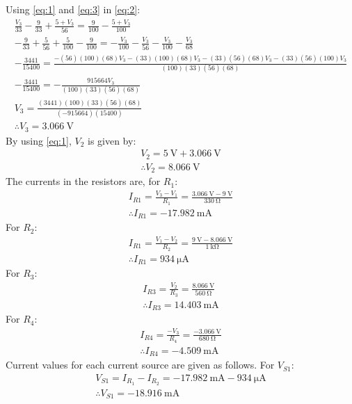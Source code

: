 \documentclass[letterpaper]{article}
\begin{document}
Using \eqref{eq:1} and \eqref{eq:3} in \eqref{eq:2}:
\begin{gather*}
    \frac{V_3}{33}-\frac{9}{33}+\frac{5+V_3}{56}=\frac{9}{100}-\frac{5+V_3}{100}\\
    -\frac{9}{33}+\frac{5}{56}+\frac{5}{100}-\frac{9}{100}=-\frac{V_3}{100}-\frac{V_3}{56}-\frac{V_3}{100}-\frac{V_3}{68}\\
    -\frac{3441}{15400}=\frac{-(56)(100)(68)V_3-(33)(100)(68)V_3-(33)(56)(68)V_3-(33)(56)(100)V_3}{(100)(33)(56)(68)}\\
    -\frac{3441}{15400}=-\frac{915664V_3}{(100)(33)(56)(68)}\\
    V_3=\frac{(3441)(100)(33)(56)(68)}{(-915664)(15400)}\\
    \therefore V_3=\SI{3.066}{\volt}
\end{gather*}
By using \eqref{eq:1}, $V_2$ is given by:
\begin{gather*}
    V_2=\SI{5}{\volt}+\SI{3.066}{\volt}\\
    \therefore V_2 = \SI{8.066}{\volt}
\end{gather*}
The currents in the resistors are, for $R_1$:
\begin{gather*}
    I_{R1}=\frac{V_3-V_1}{R_1}=\frac{\SI{3.066}{\volt}-\SI{9}{\volt}}{\SI{330}{\ohm}}\\
    \therefore I_{R1}=\SI{-17.982}{\milli\ampere}
\end{gather*}
For $R_2$:
\begin{gather*}
    I_{R1}=\frac{V_1-V_2}{R_2}=\frac{\SI{9}{\volt}-\SI{8.066}{\volt}}{\SI{1}{\kilo\ohm}}\\
    \therefore I_{R1}=\SI{934}{\micro\ampere}
\end{gather*}
For $R_3$:
\begin{gather*}
    I_{R3}=\frac{V_2}{R_3}=\frac{\SI{8.066}{\volt}}{\SI{560}{\ohm}}\\
    \therefore I_{R3}=\SI{14.403}{\milli\ampere}
\end{gather*}
For $R_4$:
\begin{gather*}
    I_{R4}=\frac{-V_3}{R_4}=\frac{\SI{-3.066}{\volt}}{\SI{680}{\ohm}}\\
    \therefore I_{R4}=\SI{-4.509}{\milli\ampere}
\end{gather*}
Current values for each current source are given as follows. For $V_{S1}$:
\begin{gather*}
    V_{S1} = I_{R_1}-I_{R_2} =
    \SI{-17.982}{\milli\ampere}-\SI{934}{\micro\ampere}\\
    \therefore V_{S1} = \SI{-18.916}{\milli\ampere}
\end{gather*}
\end{document}
